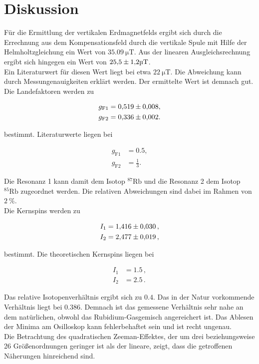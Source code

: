 \section{Diskussion}
\label{sec:Diskussion}

Für die Ermittlung der vertikalen Erdmagnetfelds ergibt sich durch die Errechnung aus dem Kompensationsfeld durch die vertikale Spule
mit Hilfe der Helmholtzgleichung ein Wert von $\SI{35.09}{\micro\tesla}$. Aus der linearen Ausgleichsrechnung ergibt 
sich hingegen ein Wert von $\num{25.5\pm 1.2}\si{\micro\tesla}$. \\
Ein Literaturwert für diesen Wert liegt bei etwa $\SI{22}{\micro\tesla}$. Die Abweichung kann durch Messungenauigkeiten erklärt werden. Der 
ermittelte Wert ist demnach gut. \\
Die Landefaktoren werden zu

\begin{align*}
    g_\text{F1} &= \num{0.519\pm 0.008},\\
    g_\text{F2} &= \num{0.336\pm 0.002}.
\end{align*}

bestimmt. Literaturwerte liegen bei 

\begin{align*}
    g_\text{F1} &= \num{0.5},\\
    g_\text{F2} &= \frac{1}{3}.
\end{align*}

Die Resonanz 1 kann damit dem Isotop $^{87}\text{Rb}$ und die Resonanz 2 dem Isotop $^{85}\text{Rb}$ zugeordnet werden. Die 
relativen Abweichungen sind dabei im Rahmen von $\SI{2}{\percent}$.\\
Die Kernspins werden zu 

\begin{align*}
    I_1 &= \num{1.416\pm 0.030}\,,\\
    I_2 &= \num{2.477\pm 0.019}\,,
  \end{align*}

bestimmt. Die theoretischen Kernspins liegen bei

\begin{align*}
    I_1 &= \num{1.5}\,,\\
    I_2 &= \num{2.5}\,.
\end{align*}

Das relative Isotopenverhältnis ergibt sich zu $\num{0.4}$. Das in der Natur vorkommende Verhältnis liegt bei $\num{0.386}$. Demnach ist 
das gemessene Verhältnis sehr nahe an dem natürlichen, obwohl das Rubidium-Gasgemisch angereichert ist. Das Ablesen der Minima am Osilloskop 
kann fehlerbehaftet sein und ist recht ungenau. \\
Die Betrachtung des quadratischen Zeeman-Effektes, der um drei beziehungsweise 26
Größenordnungen geringer ist als der lineare, zeigt, dass die getroffenen Näherungen
hinreichend sind.

